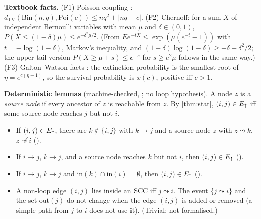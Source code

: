 \textbf{Textbook facts.} (F1) Poisson coupling \citep[Thm.~2.10]{hofstad2016random}:
$d_{\mathrm{TV}}(\mathrm{Bin}(n,q),\mathrm{Poi}(c))\le nq^2+|nq-c|$.
(F2) Chernoff: for a sum $X$ of independent Bernoulli variables with mean
$\mu$ and $\delta\in(0,1)$, $P(X\le(1-\delta)\mu)\le e^{-\delta^2\mu/2}$. (From
$Ee^{-tX}\le\exp(\mu(e^{-t}-1))$ with $t=-\log(1-\delta)$, Markov's inequality,
and $(1-\delta)\log(1-\delta)\ge-\delta+\delta^2/2$; the upper-tail version
$P(X\ge\mu+s)\le e^{-s}$ for $s\ge e^2\mu$ follows in the same way.)
(F3) Galton--Watson facts \citep[Thms.~3.1, 3.16]{hofstad2016random}: the
extinction probability is the smallest root of $\eta=e^{c(\eta-1)}$, so the
survival probability is $x(c)$, positive iff $c>1$.

\textbf{Deterministic lemmas} (machine-checked, ; no loop
hypothesis). A node $z$ is a \emph{source node} if every ancestor of $z$ is
reachable from $z$. By \cref{thm:stat}, $(i,j)\in E_{\uparrow}$ iff some source node
reaches $j$ but not $i$.
\begin{itemize}
\item[(W1)] If $(i,j)\in E_{\uparrow}$, there are $k\notin\{i,j\}$ with $k\to j$ and a
source node $z$ with $z\leadsto k$, $z\not\leadsto i$ ().
\item[(W2)] If $i\to j$, $k\to j$, and a source node reaches $k$ but not $i$,
then $(i,j)\in E_{\uparrow}$ ().
\item[(W3)] If $i\to j$, $k\to j$ and $\mathrm{in}(k)\cap\mathrm{in}(i)=\emptyset$,
then $(i,j)\in E_{\uparrow}$ ().
\item[(W5)] A non-loop edge $(i,j)$ lies inside an SCC iff $j\leadsto i$. The
event $\{j\leadsto i\}$ and the set $\mathrm{out}(j)$ do not change when the
edge $(i,j)$ is added or removed (a simple path from $j$ to $i$ does not use
it). (Trivial; not formalised.)
\end{itemize}

